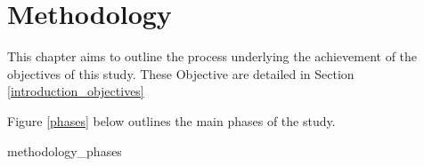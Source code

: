\chapter{Methodology}

This chapter aims to outline the process underlying the achievement of the
objectives of this study. These Objective are detailed in
Section \ref{introduction_objectives}

Figure \ref{phases} below outlines the main phases of the study.

{methodology_phases}














